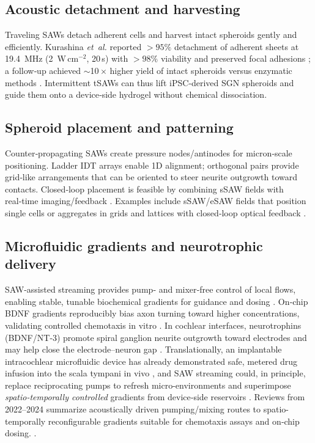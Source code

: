 \documentclass[referee,pdflatex, sn-vancouver-num]{sn-jnl}%
\theoremstyle{thmstyleone}%
\theoremstyle{thmstyletwo}%
\theoremstyle{thmstylethree}%
\begin{document}
\subsection{Acoustic detachment and harvesting}
Traveling SAWs detach adherent cells and harvest intact spheroids gently and efficiently. Kurashina \emph{et~al.} reported $>\!95\%$ detachment of adherent sheets at 19.4~MHz (2~W\,cm$^{-2}$, 20\,s) with $>\!98\%$ viability and preserved focal adhesions \cite{Kurashina2019}; a follow‑up achieved $\sim$10\,$\times$ higher yield of intact spheroids versus enzymatic methods \cite{kurihara2022}. Intermittent tSAWs can thus lift iPSC‑derived SGN spheroids and guide them onto a device‑side hydrogel without chemical dissociation.

\subsection{Spheroid placement and patterning}
Counter‑propagating SAWs create pressure nodes/antinodes for micron‑scale positioning. Ladder IDT arrays enable 1D alignment; orthogonal pairs provide grid‑like arrangements that can be oriented to steer neurite outgrowth toward contacts. Closed‑loop placement is feasible by combining sSAW fields with real‑time imaging/feedback \cite{rufo2022,Gedge2012_SAW,Cai2020_Biofabrication, Gedge2015_Theory_of_Surface_Acoustic_Wave_Device}. Examples include sSAW/eSAW fields that position single cells or aggregates in grids and lattices with closed‑loop optical feedback \cite{Yang2022_SteAST,Wu2024_MicroNano}.

\subsection{Microfluidic gradients and neurotrophic delivery}
SAW‑assisted streaming provides pump‑ and mixer‑free control of local flows, enabling stable, tunable biochemical gradients for guidance and dosing \cite{Friend2011,Ding2013,Zhang2020_AcousticMicrofluidics}. On‑chip BDNF gradients reproducibly bias axon turning toward higher concentrations, validating controlled chemotaxis in vitro \cite{Huang2014_BDNF}. In cochlear interfaces, neurotrophins (BDNF/NT‑3) promote spiral ganglion neurite outgrowth toward electrodes and may help close the electrode–neuron gap \cite{Schmidbauer2023}. Translationally, an implantable intracochlear microfluidic device has already demonstrated safe, metered drug infusion into the scala tympani in vivo \cite{Sewell2009}, and SAW streaming could, in principle, replace reciprocating pumps to refresh micro-environments and superimpose \emph{spatio-temporally controlled} gradients from device‑side reservoirs \cite{Friend2011,Ding2013}. Reviews from 2022–2024 summarize acoustically driven pumping/mixing routes to spatio-temporally reconfigurable gradients suitable for chemotaxis assays and on‑chip dosing. \cite{Rufo2022_NatCommun,Wu2024_MicroNano}.
\end{document}
